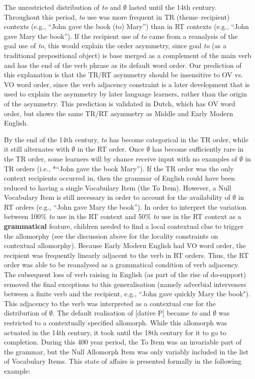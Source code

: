 	The unrestricted distribution of \textit{to} and $\emptyset$ lasted until the 14th century. Throughout this period, \textit{to} use was more frequent in TR (theme--recipient) contexts (e.g., ``John gave the book (to) Mary'') than in RT contexts (e.g., ``John gave Mary the book''). If the recipient use of \textit{to} came from a reanalysis of the goal use of \textit{to}, this would explain the order asymmetry, since goal \textit{to} (as a traditional prepositional object) is base merged as a complement of the main verb and has the end of the verb phrase as its default word order. Our prediction of this explanation is that the TR/RT asymmetry should be insensitive to OV vs. VO word order, since the verb adjacency constraint is a later development that is used to explain the asymmetry by later language learners, rather than the origin of the asymmetry. This prediction is validated in Dutch, which has OV word order, but shows the same TR/RT asymmetry as Middle and Early Modern English.
	
	By the end of the 14th century, \textit{to} has become categorical in the TR order, while it still alternates with $\emptyset$ in the RT order. Once $\emptyset$ has become sufficiently rare in the TR order, some learners will by chance receive input with no examples of $\emptyset$ in TR orders (i.e., *``John gave the book Mary''). If the TR order was the only context recipients occurred in, then the grammar of English could have been reduced to having a single Vocabulary Item (the To Item). However, a Null Vocabulary Item is still necessary in order to account for the availability of $\emptyset$ in RT orders (e.g., ``John gave Mary the book''). In order to interpret the variation between 100\% \textit{to} use in the RT context and 50\% \textit{to} use in the RT context as a \textbf{grammatical} feature, children needed to find a local contextual clue to trigger the allomorphy (see the discussion above for the locality constraints on contextual allomorphy). Because Early Modern English had VO word order, the recipient was frequently linearly adjacent to the verb in RT orders. Thus, the RT order was able to be reanalysed as a grammatical condition of verb adjacency. The subsequent loss of verb raising in English (as part of the rise of do-support) removed the final exceptions to this generalisation (namely adverbial interveners between a finite verb and the recipient, e.g., ``John gave quickly Mary the book"). This adjacency to the verb was interpreted as a contextual cue for the distribution of $\emptyset$. The default realisation of [dative P] became \textit{to} and $\emptyset$ was restricted to a contextually specified allomorph. While this allomorph was actuated in the 14th century, it took until the 18th century for it to go to completion. During this 400 year period, the To Item was an invariable part of the grammar, but the Null Allomorph Item was only variably included in the list of Vocabulary Items. This state of affairs is presented formally in the following example:

